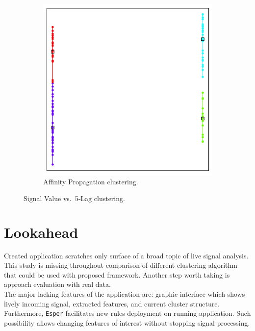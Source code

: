 \documentclass[11pt, letterpaper]{article}            %
\begin{document}
\begin{figure}[htbp]
\begin{subfigure}[b]{0.32\textwidth}
    \includegraphics[height=\textwidth]{./gfx/ap35.png}
    \caption{Affinity Propagation clustering.\label{fig:svlag:ap}}
  \end{subfigure}

  \caption{Signal Value vs.\ 5-Lag clustering.\label{fig:svlag}}
\end{figure}

\section{Lookahead}
Created application scratches only surface of a broad topic of live signal analysis.\\
This study is missing throughout comparison of different clustering algorithm that could be used with proposed framework. Another step worth taking is approach evaluation with real data.\\

The major lacking features of the application are: graphic interface which shows lively incoming signal, extracted features, and current cluster structure.\\
Furthermore, \texttt{Esper} facilitates new rules deployment on running application. Such possibility allows changing features of interest without stopping signal processing.\\
\end{document}
